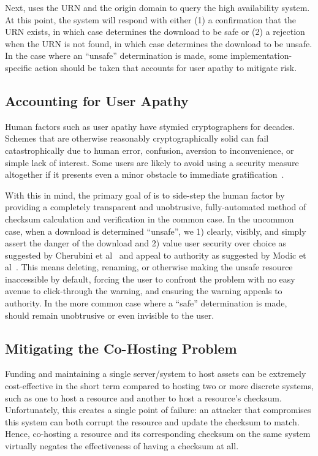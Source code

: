 Next, \SYSTEM{} uses the URN and the origin domain to query the high
availability system. At this point, the system will respond with either (1) a
confirmation that the URN exists, in which case \SYSTEM{} determines the
download to be safe or (2) a rejection when the URN is not found, in which case
\SYSTEM{} determines the download to be unsafe. In the case where an ``unsafe''
determination is made, some implementation-specific action should be taken that
accounts for user apathy to mitigate risk.

\subsection{Accounting for User Apathy}

Human factors such as user apathy have stymied cryptographers for decades.
Schemes that are otherwise reasonably cryptographically solid can fail
catastrophically due to human error, confusion, aversion to inconvenience, or
simple lack of interest. Some users are likely to avoid using a security measure
altogether if it presents even a minor obstacle to immediate
gratification~\cite{PGPBad, Egelman1, Egelman2, Modic, Reeder, Silic, Sunshine,
Bianchi, Akhawe, Cherubini}.


With this in mind, the primary goal of \SYSTEM{} is to side-step the human
factor by providing a completely transparent and unobtrusive, fully-automated
method of checksum calculation and verification in the common case. In the
uncommon case, when a download is determined ``unsafe'', we 1) clearly, visibly,
and simply assert the danger of the download and 2) value user security over
choice as suggested by Cherubini et al~\cite{Cherubini} and appeal to authority
as suggested by Modic et al~\cite{Modic}. This means deleting, renaming, or
otherwise making the unsafe resource inaccessible by default, forcing the user
to confront the problem with no easy avenue to click-through the warning, and
ensuring the warning appeals to authority. In the more common case where a
``safe'' determination is made, \SYSTEM{} should remain unobtrusive or even
invisible to the user.

\subsection{Mitigating the Co-Hosting Problem}

Funding and maintaining a single server/system to host assets can be extremely
cost-effective in the short term compared to hosting two or more discrete
systems, such as one to host a resource and another to host a resource's
checksum. Unfortunately, this creates a single point of failure: an attacker
that compromises this system can both corrupt the resource and update the
checksum to match. Hence, co-hosting a resource and its corresponding checksum
on the same system virtually negates the effectiveness of having a checksum at
all.

